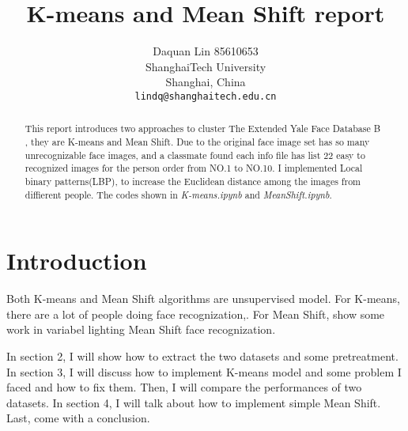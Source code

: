 \documentclass[10pt,twocolumn,letterpaper]{article}
\begin{document}
\title{K-means and Mean Shift report}

\author{Daquan Lin 85610653\\
ShanghaiTech University\\
Shanghai, China\\
{\tt\small lindq@shanghaitech.edu.cn}
}

\maketitle

\begin{abstract}
   This report introduces two approaches to cluster The Extended Yale Face Database B\cite{GeBeKr01} , they are K-means and Mean Shift. Due to the original face image set has so many unrecognizable face images, and a classmate found each info file has list 22 easy to recognized images for the person order from NO.1 to NO.10. I implemented Local binary patterns(LBP)\cite{ahonen2006face},\cite{ahonen2004face} to increase the Euclidean distance among the images from diffierent people. The codes shown in \emph{K-means.ipynb} and \emph{MeanShift.ipynb}.

\end{abstract}

\section{Introduction}
Both K-means and Mean Shift algorithms are unsupervised model. For K-means, there are a lot of people doing face recognization\cite{sung1998example},\cite{su2001modified}. For Mean Shift, \cite{chen2006total} show some work in variabel lighting Mean Shift face recognization.

\par In section 2, I will show how to extract the two datasets and some pretreatment. In section 3, I will discuss how to implement K-means model and some problem I faced and how to fix them. Then, I will compare the performances of two datasets. In section 4, I will talk about how to implement simple Mean Shift. Last, come with a conclusion.

\end{document}
